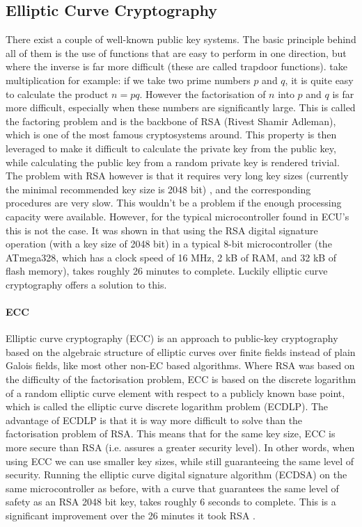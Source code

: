 \subsection{Elliptic Curve Cryptography}
\label{subsec:ECC}

There exist a couple of well-known public key systems. The basic principle behind all of them is the use of functions that are easy to perform in one direction, but where the inverse is far more difficult (these are called trapdoor functions). take multiplication for example: if we take two prime numbers $p$ and $q$, it is quite easy to calculate the product $n=pq$. However the factorisation of $n$ into $p$ and $q$ is far more difficult, especially when these numbers are significantly large. This is called the factoring problem and is the backbone of RSA (Rivest Shamir Adleman), which is one of the most famous cryptosystems around. This property is then leveraged to make it difficult to calculate the private key from the public key, while calculating the public key from a random private key is rendered trivial. The problem with RSA however is that it requires very long key sizes (currently the minimal recommended key size is 2048 bit) \cite{wiki:RSA}, and the corresponding procedures are very slow. This wouldn't be a problem if the enough processing capacity were available. However, for the typical microcontroller found in ECU's this is not the case. It was shown in \cite{Sethi} that using the RSA digital signature operation (with a key size of 2048 bit) in a typical 8-bit microcontroller (the ATmega328, which has a clock speed of 16 MHz, 2 kB of RAM, and 32 kB of flash memory), takes roughly 26 minutes to complete. Luckily elliptic curve cryptography offers a solution to this.

\paragraph{ECC} Elliptic curve cryptography (ECC) is an approach to public-key cryptography based on the algebraic structure of elliptic curves over finite fields instead of plain Galois fields, like most other non-EC based algorithms. Where RSA was based on the difficulty of the factorisation problem, ECC is based on the discrete logarithm of a random elliptic curve element with respect to a publicly known base point, which is called the elliptic curve discrete logarithm problem (ECDLP)\cite{wiki:ECC}. The advantage of ECDLP is that it is way more difficult to solve than the factorisation problem of RSA. This means that for the same key size, ECC is more secure than RSA (i.e. assures a greater security level). In other words, when using ECC we can use smaller key sizes, while still guaranteeing the same level of security. Running the elliptic curve digital signature algorithm (ECDSA) on the same microcontroller as before, with a curve that guarantees the same level of safety as an RSA 2048 bit key, takes roughly 6 seconds to complete. This is a significant improvement over the 26 minutes it took RSA \cite{Sethi}.

